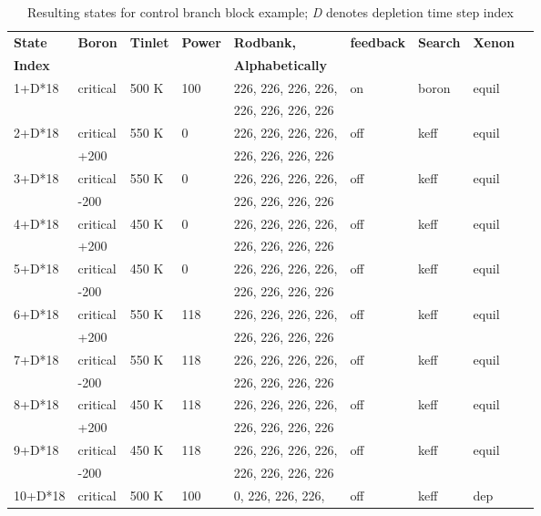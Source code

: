 \begin{table}[ht]
    \centering
    \caption{Resulting states for control branch block example; \emph{D} denotes depletion time step index}\label{tab:branch-example-complicated}
    \begin{tabular}{|l|l|l|l|l|l|l|l|l|}\hline
    \textbf{State} & \textbf{Boron} & \textbf{Tinlet} & \textbf{Power} & \textbf{Rodbank,} & \textbf{feedback} & \textbf{Search} & \textbf{Xenon} \\
    \textbf{Index} & & & & \textbf{Alphabetically} &  &  & \\\hline
    1+D*18 & critical & 500 K & 100 & 226, 226, 226, 226, & on & boron & equil \\
    &  &  &  & 226, 226, 226, 226  &  &  & \\\hline
    2+D*18 & critical & 550 K & 0 & 226, 226, 226, 226, & off & keff & equil \\
    & +200 &  &  & 226, 226, 226, 226  &  &  & \\\hline
    3+D*18 & critical & 550 K & 0 & 226, 226, 226, 226, & off & keff & equil \\
    & -200 &  &  & 226, 226, 226, 226  &  &  & \\\hline
    4+D*18 & critical & 450 K & 0 & 226, 226, 226, 226, & off & keff & equil \\
    & +200 &  &  & 226, 226, 226, 226  &  &  & \\\hline
    5+D*18 & critical & 450 K & 0 & 226, 226, 226, 226, & off & keff & equil \\
    & -200 &  &  & 226, 226, 226, 226  &  &  & \\\hline
    6+D*18 & critical & 550 K & 118 & 226, 226, 226, 226, & off & keff & equil \\
    & +200 &  &  & 226, 226, 226, 226  &  &  & \\\hline
    7+D*18 & critical & 550 K & 118 & 226, 226, 226, 226, & off & keff & equil \\
    & -200 &  &  & 226, 226, 226, 226  &  &  & \\\hline
    8+D*18 & critical  & 450 K & 118 & 226, 226, 226, 226, & off & keff & equil \\
    & +200 &  &  & 226, 226, 226, 226  &  &  & \\\hline
    9+D*18 & critical & 450 K & 118 & 226, 226, 226, 226, & off & keff & equil \\
    & -200 &  &  & 226, 226, 226, 226  &  &  & \\\hline
    10+D*18 & critical & 500 K & 100 & 0, 226, 226, 226, & off & keff & dep \\

\end{tabular}
\end{table}
